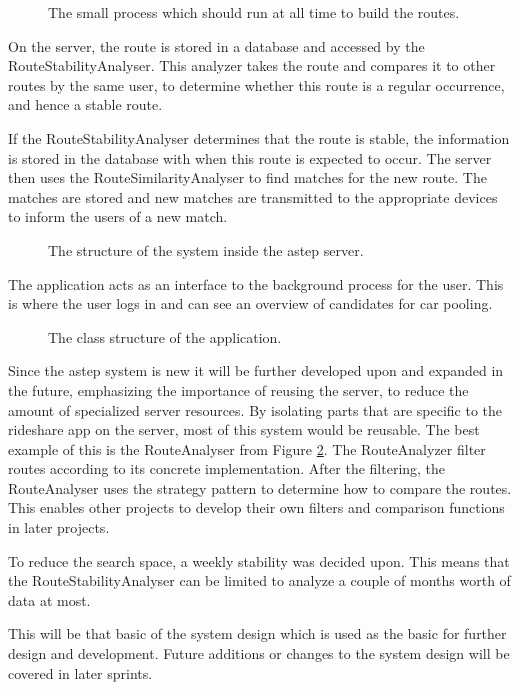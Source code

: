 \begin{figure}[h]
	\centering
	
	\caption{The small process which should run at all time to build the routes.}
	\label{fig:classDiagramSprint1Observer}
\end{figure}


On the server, the route is stored in a database and accessed by the RouteStabilityAnalyser.
This analyzer takes the route and compares it to other routes by the same user, to determine whether this route is a regular occurrence, and hence a stable route.

If the RouteStabilityAnalyser determines that the route is stable, the information is stored in the database with when this route is expected to occur.
The server then uses the RouteSimilarityAnalyser to find matches for the new route.
The matches are stored and new matches are transmitted to the appropriate devices to inform the users of a new match.

\begin{figure}[ht!]
	\centering
	
	\caption{The structure of the system inside the \gls{astep} server.}
	\label{fig:classDiagramSprint1Server}
\end{figure}

The application acts as an interface to the background process for the user.
This is where the user logs in and can see an overview of candidates for car pooling.

\begin{figure}[ht!]
	\centering
	
	\caption{The class structure of the application.}
	\label{fig:classDiagramSprint1Application}
\end{figure}

Since the \gls{astep} system is new it will be further developed upon and expanded in the future, emphasizing the importance of reusing the server, to reduce the amount of specialized server resources.
By isolating parts that are specific to the rideshare app on the server, most of this system would be reusable.
The best example of this is the RouteAnalyser from Figure \ref{fig:classDiagramSprint1Server}.
The RouteAnalyzer filter routes according to its concrete implementation.
After the filtering, the RouteAnalyser uses the strategy pattern to determine how to compare the routes.
This enables other projects to develop their own filters and comparison functions in later projects.

To reduce the search space, a weekly stability was decided upon.
This means that the RouteStabilityAnalyser can be limited to analyze a couple of months worth of data at most.

This will be that basic of the system design which is used as the basic for further design and development.
Future additions or changes to the system design will be covered in later sprints. 

